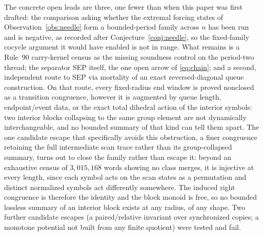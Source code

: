 \documentclass[11pt]{article}
\theoremstyle{definition}
\begin{document}
The concrete open leads are three, one fewer than when this paper was first
drafted: the comparison asking whether the extremal forcing states of
Observation~\ref{obs:needle} form a bounded-period family across $n$ has been
run and is negative, as recorded after Conjecture~\ref{conj:needle}, so the
fixed-family cocycle argument it would have enabled is not in range. What
remains is a
Rule~90 carry-kernel census as the missing soundness control on the period-two
thread; the separator SEP itself, the one open arrow of \eqref{eq:chain}; and
a second, independent route to SEP via mortality of an exact reversed-diagonal
queue construction. On that route, every fixed-radius end window is proved
nonclosed as a transition congruence, however it is augmented by queue
length, endpoint/event data, or the exact total dihedral action of the
interior symbols: two interior blocks collapsing to the same group element
are not dynamically interchangeable, and no bounded summary of that kind can
tell them apart. The one candidate escape that specifically avoids this
obstruction, a finer congruence retaining the full intermediate scan trace
rather than its group-collapsed summary, turns out to close the family rather
than escape it: beyond an exhaustive census of $3{,}015{,}168$ words showing no
class merges, it is injective at every length, since each symbol acts on the
scan states as a permutation and distinct normalized symbols act differently
somewhere. The induced right congruence is therefore the identity and the block
monoid is free, so no bounded lossless summary of an interior block exists at
any radius, of any shape.
Two further candidate escapes (a paired/relative invariant over synchronized
copies; a monotone potential not built from any finite quotient) were tested
and fail.
\end{document}

